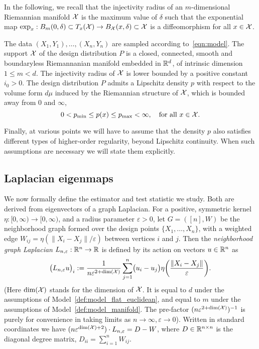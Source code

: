 In the following, we recall that the injectivity radius of an $m$-dimensional Riemannian manifold $\mathcal{X}$ is the maximum value of $\delta$ such that the exponential map $\exp_x: B_m(0,\delta) \subset T_x(\mathcal{X}) \to B_{\mathcal{X}}(x,\delta) \subset \mathcal{X}$ is a diffeomorphism for all $x \in \mathcal{X}$.
\begin{definition}
	\label{def:model_manifold}
	The data $(X_1,Y_1),\ldots,(X_n,Y_n)$ are sampled according to~\eqref{eqn:model}. 
	The support $\mathcal{X}$ of the design distribution $P$ is a closed, connected, smooth and boundaryless Riemannanian manifold embedded in $\mathbb{R}^d$, of intrinsic dimension $1 \leq m < d$. The injectivity radius of $\mathcal{X}$ is lower bounded by a positive constant $i_0 > 0$. The design distribution $P$ admits a Lipschitz density $p$ with respect to the volume form $d\mu$ induced by the Riemannian structure of $\mathcal{X}$, which is bounded away from $0$ and $\infty$,
	\begin{equation*}
	0 < p_{\min} \leq p(x) \leq p_{\max} < \infty, \quad \textrm{for all $x \in \mathcal{X}$.}
	\end{equation*}
\end{definition}

Finally, at various points we will have to assume that the density $p$ also satisfies different types of higher-order regularity, beyond Lipschitz continuity. When such assumptions are necessary we will state them explicitly.

\subsection{Laplacian eigenmaps}
We now formally define the estimator and test statistic we study. Both are derived from eigenvectors of a graph Laplacian.  For a positive, symmetric kernel $\eta: [0,\infty) \to [0,\infty)$, and a radius parameter $\varepsilon > 0$, let $G = ([n],W)$ be the neighborhood graph formed over the design points $\{X_1,\ldots,X_n\}$, with a weighted edge $W_{ij} = \eta(\|X_i - X_j\|/\varepsilon)$ between vertices $i$ and $j$. Then the 
\emph{neighborhood graph Laplacian} $L_{n,\varepsilon}: \mathbb{R}^n \to \mathbb{R}$ is defined by its action on vectors $u \in \mathbb{R}^n$ as
\begin{equation}
\label{eqn:neighborhood_graph_laplacian}
\bigl(L_{n,\varepsilon}u\bigr)_i := \frac{1}{n\varepsilon^{2 + \mathrm{dim}(\mathcal{X})}} \sum_{j = 1}^{n} \bigl(u_i - u_j\bigr) \eta\biggl(\frac{\|X_i - X_j\|}{\varepsilon}\biggr).
\end{equation}
(Here $\mathrm{dim}(\mathcal{X})$ stands for the dimension of $\mathcal{X}$. It is equal to $d$ under the assumptions of Model~\ref{def:model_flat_euclidean}, and equal to $m$ under the assumptions of Model~\ref{def:model_manifold}. The pre-factor $(n\varepsilon^{2 + \mathrm{dim}(\mathcal{X})})^{-1}$ is purely for convenience in taking limits as $n \to \infty, \varepsilon \to 0$). Written in standard coordinates we have $(n\varepsilon^{\dim(\mathcal{X}) + 2}) \cdot L_{n,\varepsilon} = D - W$, where $D \in \mathbb{R}^{n \times n}$ is the diagonal degree matrix, $D_{ii} = \sum_{i = 1}^{n} W_{ij}$.

